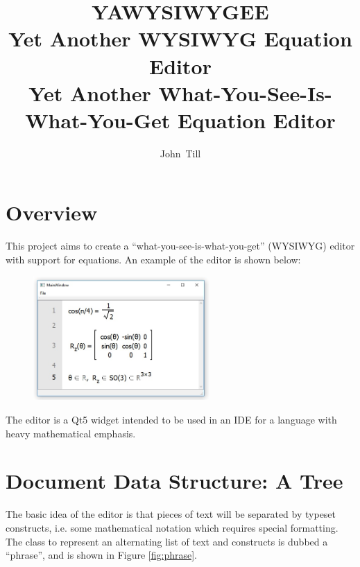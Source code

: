 \documentclass[12pt]{article}
\title{\bf \Huge{YAWYSIWYGEE} \\ \Large{Yet Another WYSIWYG Equation Editor} \\ \normalsize{Yet Another What-You-See-Is-What-You-Get Equation Editor}}
\author{John~Till}
\date{}
\begin{document}
	\setcounter{page}{2}

	\maketitle

	\setcounter{page}{1}

\section{Overview}

This project aims to create a ``what-you-see-is-what-you-get'' (WYSIWYG) editor with support for equations. An example of the editor is shown below:

\begin{figure}[ht]
	\centering
		\includegraphics[width=0.60\textwidth]{Fig/Screenshot.jpg}
	\caption{}
	\label{fig:screenshot}
\end{figure}

The editor is a Qt5 widget intended to be used in an IDE for a language with heavy mathematical emphasis.

\section{Document Data Structure: A Tree}

The basic idea of the editor is that pieces of text will be separated by typeset constructs, i.e. some mathematical notation which requires special formatting. The class to represent an alternating list of text and constructs is dubbed a ``phrase'', and is shown in Figure \ref{fig:phrase}.
\end{document}
